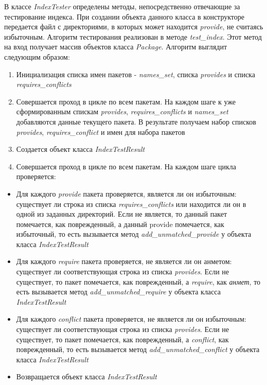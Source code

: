В классе \textit{IndexTester} определены методы, непосредственно отвечающие за тестирование
индекса. При создании объекта данного класса в конструкторе передается файл с директориями,
в которых может находится \textit{provide}, не считаясь избыточным. 
Алгоритм тестирования реализован в методе \textit{test\_index}. Этот метод на вход
получает массив объектов класса \textit{Package}. Алгоритм выглядит следующим образом:
\begin{enumerate}
\item{Инициализация списка имен пакетов - \textit{names\_set}, списка \textit{provides} и 
списка \textit{requires\_conflicts}}
\item{Совершается проход в цикле по всем пакетам. На каждом шаге 
к уже сформированным спискам \textit{provides}, \textit{requires\_conflicts} и \textit{names\_set} 
добавляются данные текущего пакета. В результате получаем набор списков \textit{provides}, 
\textit{requires\_conflict} и имен для набора пакетов}
\item{Создается объект класса \textit{IndexTestResult}}
\item{Совершается проход в цикле по всем пакетам. На каждом шаге цикла проверяется:}
\end{enumerate}
\begin{itemize}
	\item{Для каждого \textit{provide} пакета проверяется, является ли он избыточным: существует ли
	строка из списка \textit{requires\_conflicts} или находится ли он в одной из заданных директорий.
	Если не является, то данный пакет помечается, как поврежденный, а данный provide помечается,
	как избыточный, то есть вызывается метод \emph{add\_unmatched\_provide} у объекта класса \textit{IndexTestResult}}
	\item{Для каждого \textit{require} пакета проверяется, не является ли он анметом: существует ли
	соответствующая строка из списка \textit{provides}. Если не существует, то пакет помечается, как 
	поврежденный, а \textit{require}, как \textit{анмет}, то есть вызывается метод \textit{add\_unmatched\_require}
	у объекта класса \textit{IndexTestResult}}
	\item{Для каждого \textit{conflict} пакета проверяется, не является ли он избыточным: существует ли
	соответствующая строка из списка \textit{provides}. Если не существует, то пакет помечается, как 
	поврежденный, а \textit{conflict}, как поврежденный, то есть вызывается метод \textit{add\_unmatched\_conflict}
	у объекта класса \textit{IndexTestResult}}
	\item{Возвращается объект класса \textit{IndexTestResult}}
\end{itemize}

